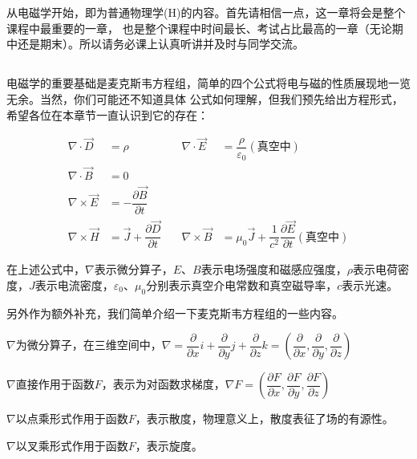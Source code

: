 \chapter[电磁学]{}
从电磁学开始，即为普通物理学(H)的内容。首先请相信一点，这一章将会是整个课程中最重要的一章，
也是整个课程中时间最长、考试占比最高的一章（无论期中还是期末）。所以请务必课上认真听讲并及时与同学交流。
\section[导论]{}
电磁学的重要基础是麦克斯韦方程组，简单的四个公式将电与磁的性质展现地一览无余。当然，你们可能还不知道具体
公式如何理解，但我们预先给出方程形式，希望各位在本章节一直认识到它的存在：
\begin{law}
    \begin{align*}
        \nabla \cdot \vec{D} &= \rho\quad &\nabla \cdot \vec{E} &= \dfrac{\rho}{\varepsilon_0}(\text{真空中})\\[1.5em]
        \nabla \cdot \vec{B} &= 0\quad & & \\[1.5em]
        \nabla \times \vec{E} &= -\dfrac{\partial \vec{B}}{\partial t}\quad & & \\[1.5em]
        \nabla \times \vec{H} &= \vec{J}+\dfrac{\partial \vec{D}}{\partial t}\quad &\nabla \times \vec{B} &= \mu_0\vec{J}+\dfrac{1}{c^2}\dfrac{\partial \vec{E}}{\partial t}(\text{真空中})
    \end{align*}
\end{law}

在上述公式中，$\nabla$表示微分算子，$E$、$B$表示电场强度和磁感应强度，$\rho$表示电荷密度，$J$表示电流密度，$\varepsilon_0$、$\mu_0$分别表示真空介电常数和真空磁导率，$c$表示光速。

另外作为额外补充，我们简单介绍一下麦克斯韦方程组的一些内容。
\begin{Itemize}
    \item $\nabla$为微分算子，在三维空间中，$\nabla = \dfrac{\partial}{\partial x}i + \dfrac{\partial}{\partial y}j + \dfrac{\partial}{\partial z}k =
    (\dfrac{\partial}{\partial x},\dfrac{\partial}{\partial y},\dfrac{\partial}{\partial z})$
    \item $\nabla$直接作用于函数$F$，表示为对函数求梯度，$\nabla F = (\dfrac{\partial F}{\partial x} , \dfrac{\partial F}{\partial y} , \dfrac{\partial F}{\partial z})$
    \item $\nabla$以点乘形式作用于函数$F$，表示散度，物理意义上，散度表征了场的有源性。
    \item $\nabla$以叉乘形式作用于函数$F$，表示旋度。
\end{Itemize}

